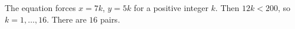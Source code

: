 The equation forces $x=7k$, $y=5k$ for a positive integer $k$. Then $12k<200$, so $k=1,\ldots,16$. There are $\boxed{16}$ pairs.
